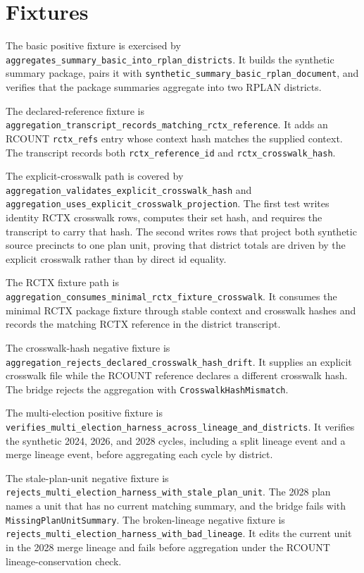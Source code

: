 \section{Fixtures}

The basic positive fixture is exercised by
\texttt{aggregates\_summary\_basic\_into\_rplan\_districts}. It builds the
synthetic summary package, pairs it with
\texttt{synthetic\_summary\_basic\_rplan\_document}, and verifies that the
package summaries aggregate into two RPLAN districts.

The declared-reference fixture is
\texttt{aggregation\_transcript\_records\_matching\_rctx\_reference}. It adds an
RCOUNT \texttt{rctx\_refs} entry whose context hash matches the supplied
context. The transcript records both \texttt{rctx\_reference\_id} and
\texttt{rctx\_crosswalk\_hash}.

The explicit-crosswalk path is covered by
\texttt{aggregation\_validates\_explicit\_crosswalk\_hash} and
\texttt{aggregation\_uses\_explicit\_crosswalk\_projection}. The first test
writes identity RCTX crosswalk rows, computes their set hash, and requires the
transcript to carry that hash. The second writes rows that project both
synthetic source precincts to one plan unit, proving that district totals are
driven by the explicit crosswalk rather than by direct id equality.

The RCTX fixture path is
\texttt{aggregation\_consumes\_minimal\_rctx\_fixture\_crosswalk}. It consumes
the minimal RCTX package fixture through stable context and crosswalk hashes and
records the matching RCTX reference in the district transcript.

The crosswalk-hash negative fixture is
\texttt{aggregation\_rejects\_declared\_crosswalk\_hash\_drift}. It supplies an
explicit crosswalk file while the RCOUNT reference declares a different
crosswalk hash. The bridge rejects the aggregation with
\texttt{CrosswalkHashMismatch}.

The multi-election positive fixture is
\texttt{verifies\_multi\_election\_harness\_across\_lineage\_and\_districts}.
It verifies the synthetic 2024, 2026, and 2028 cycles, including a split lineage
event and a merge lineage event, before aggregating each cycle by district.

The stale-plan-unit negative fixture is
\texttt{rejects\_multi\_election\_harness\_with\_stale\_plan\_unit}. The 2028
plan names a unit that has no current matching summary, and the bridge fails
with \texttt{MissingPlanUnitSummary}. The broken-lineage negative fixture is
\texttt{rejects\_multi\_election\_harness\_with\_bad\_lineage}. It edits the
current unit in the 2028 merge lineage and fails before aggregation under the
RCOUNT lineage-conservation check.
